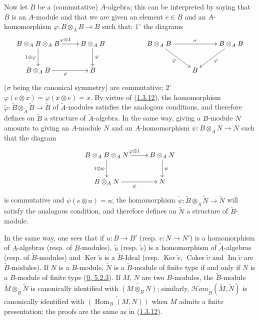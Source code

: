 \begin{env}[1.3.13]
\label{I.1.3.13}
Now let $B$ be a (commutative) $A$-algebra; this can be interpreted by
saying that $B$ is an $A$-module and that we are given an element $e\in B$
and an $A$-homomorphism
$\varphi:B\otimes_A B\to B$ such that: $1^\circ$ the diagrams
\[
  \xymatrix{
    B\otimes_A B\otimes_A B\ar[r]^{\varphi\otimes 1}
      \ar[d]_{1\otimes\varphi} &
    B\otimes_A B\ar[d]^\varphi & &
    B\otimes_A B\ar[rr]^\sigma\ar[rd]_\varphi & &
    B\otimes_A B\ar[dl]^\varphi\\
    B\otimes_A B\ar[r]_\varphi &
    B & & & B
  }
\]
($\sigma$ being the canonical symmetry) are commutative; $2^\circ$
$\varphi(e\otimes x)=\varphi(x\otimes e)=x$. By virtue of
(\hyperref[I.1.3.12]{1.3.12}), the homomorphism
$\widetilde{\varphi}:\widetilde{B}\otimes_{\widetilde{A}}\widetilde{B}
\to\widetilde{B}$ of $\widetilde{A}$-modules satisfies the analogous
conditions, and therefore defines on $\widetilde{B}$ a structure of
$\widetilde{A}$-algebra. In the same way, giving a $B$-module $N$
amounts to giving an $A$-module $N$ and an $A$-homomorphism
$\psi:B\otimes_A N\to N$ such that the diagram
\[
  \xymatrix{
    B\otimes_A B\otimes_A N\ar[r]^{\varphi\otimes 1}
      \ar[d]_{1\otimes\psi} &
    B\otimes_A N\ar[d]^\psi\\
    B\otimes_A N\ar[r]_\psi & N
  }
\]
is commutative and $\psi(e\otimes n)=n$; the homomorphism
$\widetilde{\psi}:\widetilde{B}\otimes_{\widetilde{A}}\widetilde{N}
\to\widetilde{N}$ will satisfy the analogous condition, and therefore
defines on $\widetilde{N}$ a structure of $\widetilde{B}$-module.

In the same way, one sees that if $u:B\to B'$ (resp. $v:N\to N'$) is a
homomorphism of $A$-algebras (resp. of $B$-modules), $\widetilde{u}$
(resp. $\widetilde{v}$) is a homomorphism of $\widetilde{A}$-algebras
(resp. of $\widetilde{B}$-modules) and $\operatorname{Ker}\widetilde{u}$ is
a $\widetilde{B}$-Ideal (resp. $\operatorname{Ker}\widetilde{v}$,
$\operatorname{Coker}\widetilde{v}$ and $\operatorname{Im}\widetilde{v}$
are $\widetilde{B}$-modules). If $N$ is a $B$-module, $\widetilde{N}$ is
a $\widetilde{B}$-module of finite type if and only if $N$ is a
$B$-module of finite type (\hyperref[0.5.2.3]{0, 5.2.3}).
If $M$, $N$ are two $B$-modules, the $\widetilde{B}$-module
$\widetilde{M}\otimes_{\widetilde{B}}\widetilde{N}$ is canonically
identified with $\widetilde{(M\otimes_B N)}$; similarly,
$\mathscr{H}\!om_{\widetilde{B}}(\widetilde{M},\widetilde{N})$ is
canonically identified with $\widetilde{(\operatorname{Hom}_B(M,N))}$ when
$M$ admits a finite presentation; the proofs are the same as in
(\hyperref[I.1.3.12]{1.3.12}).


\end{env}
